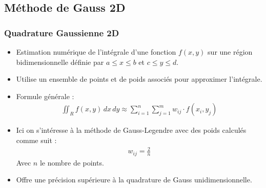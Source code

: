 \documentclass[10pt]{beamer}
\begin{document}
\subsection{Méthode de Gauss 2D}
\begin{frame}
    \frametitle{Quadrature Gaussienne 2D}
    \footnotesize
    \begin{itemize}
        \item Estimation numérique de l'intégrale d'une fonction $f(x, y)$ sur une région bidimensionnelle définie par $a \leq x \leq b$ et $c \leq y \leq d$.
        
        \item Utilise un ensemble de points et de poids associés pour approximer l'intégrale.
        
        \item Formule générale :
            \begin{align*}
            \iint_{R} f(x, y) \,dx\,dy \approx \sum_{i=1}^{n} \sum_{j=1}^{m} w_{ij} \cdot f(x_i, y_j)
            \end{align*}
        
        \item Ici on s'intéresse à la méthode de Gauss-Legendre avec des poids calculés comme suit : 
        \begin{align*}
            w_{ij} = \frac{2}{n}
        \end{align*}
        Avec $n$ le nombre de points.
        \item Offre une précision supérieure à la quadrature de Gauss unidimensionnelle.
    \end{itemize}
\end{frame}
\end{document}
